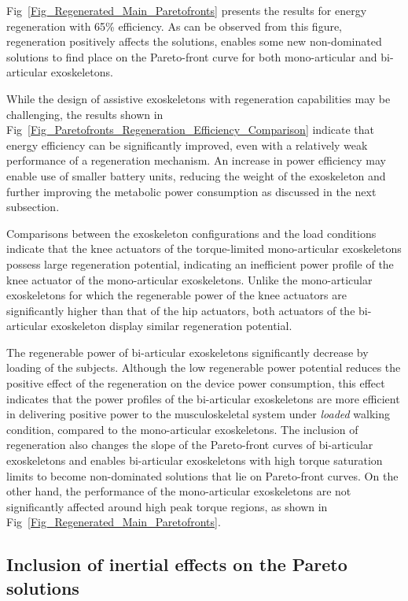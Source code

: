 \documentclass[10pt,letterpaper]{article}
\begin{document}
Fig~\ref{Fig_Regenerated_Main_Paretofronts} presents the results for energy regeneration with 65\% efficiency. As can be observed from this figure, regeneration positively affects the solutions, enables some new non-dominated solutions to find place on the Pareto-front curve for both mono-articular and bi-articular exoskeletons.


While the design of assistive exoskeletons with regeneration capabilities may be challenging, the results shown in Fig~\ref{Fig_Paretofronts_Regeneration_Efficiency_Comparison} indicate that energy efficiency can be significantly improved, even with a relatively weak performance of a regeneration mechanism. An increase in power efficiency may enable use of smaller battery units, reducing the weight of the exoskeleton  and further improving the metabolic power consumption as discussed in the next subsection.

Comparisons between the exoskeleton configurations and the load conditions indicate that the knee actuators of the torque-limited mono-articular exoskeletons possess large regeneration potential, indicating an inefficient power profile of the knee actuator of the mono-articular exoskeletons. Unlike the mono-articular exoskeletons for which the regenerable power of the knee actuators are significantly higher than that of the hip actuators, both actuators of the bi-articular exoskeleton display similar regeneration potential.

The regenerable power of bi-articular exoskeletons significantly decrease by loading of the subjects. Although the low regenerable power potential reduces the positive effect of the regeneration on the device power consumption, this effect indicates that the power profiles of the bi-articular exoskeletons are more efficient in delivering positive power to the musculoskeletal system under \emph{loaded} walking condition, compared to the mono-articular exoskeletons. The inclusion of regeneration also changes the slope of the Pareto-front curves of bi-articular exoskeletons and enables bi-articular exoskeletons with high torque saturation limits to become  non-dominated solutions that lie on Pareto-front curves. On the other hand, the performance of the mono-articular exoskeletons are not significantly affected around high peak torque regions, as shown in Fig~\ref{Fig_Regenerated_Main_Paretofronts}.


\subsection*{Inclusion of inertial effects on the Pareto solutions}
\end{document}
